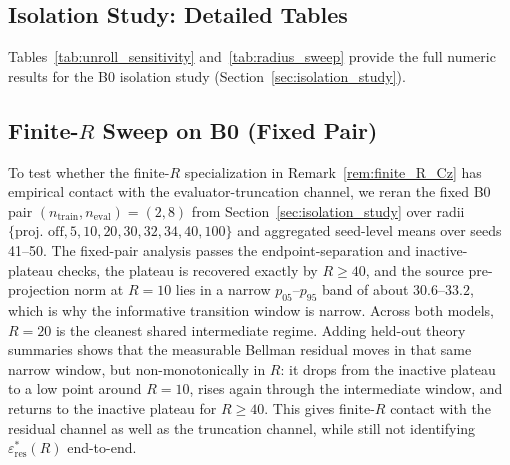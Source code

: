 \documentclass{article}
\theoremstyle{plain}
\theoremstyle{definition}
\theoremstyle{remark}
\begin{document}
\subsection{Isolation Study: Detailed Tables}
\label{app:exp1_tables}

Tables~\ref{tab:unroll_sensitivity} and~\ref{tab:radius_sweep} provide the full numeric results for the B0 isolation study (Section~\ref{sec:isolation_study}).




\subsection{Finite-$R$ Sweep on B0 (Fixed Pair)}
\label{app:finite_r_b0}

To test whether the finite-$R$ specialization in Remark~\ref{rem:finite_R_Cz} has empirical contact with the evaluator-truncation channel, we reran the fixed B0 pair $(n_{\mathrm{train}}, n_{\mathrm{eval}})=(2,8)$ from Section~\ref{sec:isolation_study} over radii $\{\text{proj.\ off}, 5, 10, 20, 30, 32, 34, 40, 100\}$ and aggregated seed-level means over seeds 41--50. The fixed-pair analysis passes the endpoint-separation and inactive-plateau checks, the plateau is recovered exactly by $R{\ge}40$, and the source pre-projection norm at $R{=}10$ lies in a narrow $p_{05}$--$p_{95}$ band of about $30.6$--$33.2$, which is why the informative transition window is narrow. Across both models, $R{=}20$ is the cleanest shared intermediate regime. Adding held-out theory summaries shows that the measurable Bellman residual moves in that same narrow window, but non-monotonically in $R$: it drops from the inactive plateau to a low point around $R{=}10$, rises again through the intermediate window, and returns to the inactive plateau for $R{\ge}40$. This gives finite-$R$ contact with the residual channel as well as the truncation channel, while still not identifying $\varepsilon_{\mathrm{res}}^*(R)$ end-to-end.
\end{document}
